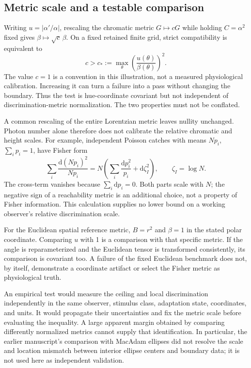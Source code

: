 \documentclass[9pt,twocolumn,twoside]{opticajnl}
\theoremstyle{plain}
\newcommand{\dd}{\mathrm{d}}
\begin{document}
\subsection{Metric scale and a testable comparison}
Writing $u=|\alpha'/\alpha|$, rescaling the chromatic metric $G\mapsto cG$ while holding $C=\alpha^2$ fixed gives $\beta\mapsto\sqrt c\,\beta$. On a fixed retained finite grid, strict compatibility is equivalent to
\begin{equation}
 c>c_*:=\max_\theta\left(\frac{u(\theta)}{\beta(\theta)}\right)^2.
 \label{eq:scale}
\end{equation}
The value $c=1$ is a convention in this illustration, not a measured physiological calibration. Increasing it can turn a failure into a pass without changing the boundary. Thus the test is hue-coordinate covariant but not independent of discrimination-metric normalization. The two properties must not be conflated.

A common rescaling of the entire Lorentzian metric leaves nullity unchanged. Photon number alone therefore does not calibrate the relative chromatic and height scales. For example, independent Poisson catches with means $Np_i$, $\sum_i p_i=1$, have Fisher form
\begin{equation}
 \sum_i\frac{\dd(Np_i)^2}{Np_i}
 =N\left(\sum_i\frac{\dd p_i^2}{p_i}+\dd\zeta_I^2\right),
 \qquad \zeta_I=\log N.
 \label{eq:poisson-scale}
\end{equation}
The cross-term vanishes because $\sum_i\dd p_i=0$. Both parts scale with $N$; the negative sign of a reachability metric is an additional choice, not a property of Fisher information. This calculation supplies no lower bound on a working observer's relative discrimination scale.

For the Euclidean spatial reference metric, $B=r^2$ and $\beta=1$ in the stated polar coordinate. Comparing $u$ with 1 is a comparison with that specific metric. If the angle is reparameterized and the Euclidean tensor is transformed consistently, its comparison is covariant too. A failure of the fixed Euclidean benchmark does not, by itself, demonstrate a coordinate artifact or select the Fisher metric as physiological truth.

An empirical test would measure the ceiling and local discrimination independently in the same observer, stimulus class, adaptation state, coordinates, and units. It would propagate their uncertainties and fix the metric scale before evaluating the inequality. A large apparent margin obtained by comparing differently normalized metrics cannot supply that identification. In particular, the earlier manuscript's comparison with MacAdam ellipses \cite{MacAdam1942} did not resolve the scale and location mismatch between interior ellipse centers and boundary data; it is not used here as independent validation.
\end{document}
